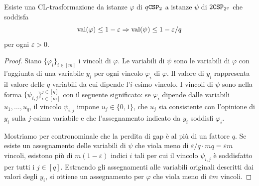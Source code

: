 \begin{lemma}
	Esiste una CL-trasformazione da istanze $\varphi$ di $q\mathtt{CSP}_2$ a istanze
	$\psi$ di $2\mathtt{CSP}_{2^q}$ che soddisfa
	\[
		\operatorname{val}(\varphi) \le 1 - \varepsilon \Rightarrow \operatorname{val}(\psi) \le 1 - \varepsilon / q
	\]
	per ogni $\varepsilon > 0$.
\end{lemma}
\begin{proof}
	Siano $\{ \varphi_i \}_{i \in [m]}$ i vincoli di $\varphi$.
	Le variabili di $\psi$ sono le variabili di $\varphi$ con l'aggiunta di una
	variabile $y_i$ per ogni vincolo $\varphi_i$ di $\varphi$.
	Il valore di $y_i$ rappresenta il valore delle $q$ variabili da cui dipende
	l'$i$-esimo vincolo. I vincoli di $\psi$ sono nella forma
	$\{\psi_{i, j}\}_{i \in [m]}^{j \in [q]}$ con il seguente significato: se
	$\varphi_i$ dipende dalle variabili $u_1, \dots, u_q$, il vincolo $\psi_{i,j}$
	impone $u_j \in \{0, 1\}$, che $u_j$ sia consistente con l'opinione di $y_i$
	sulla $j$-esima variabile e che l'assegnamento indicato da $y_i$ soddisfi
	$\varphi_i$.

	Mostriamo per contronominale che la perdita di gap è al più di un fattore
	$q$. Se esiste un assegnamento delle variabili di $\psi$ che viola meno di
	$\varepsilon/q \cdot mq = \varepsilon m$ vincoli, esistono più di
	$m(1 - \varepsilon)$ indici $i$ tali per cui il vincolo $\psi_{i, j}$ è
	soddisfatto per tutti i $j \in [q]$. Estraendo gli assegnamenti alle
	variabili originali descritti dai valori degli $y_i$, si ottiene un
	assegnamento per $\varphi$ che viola meno di $\varepsilon m$ vincoli.
\end{proof}


